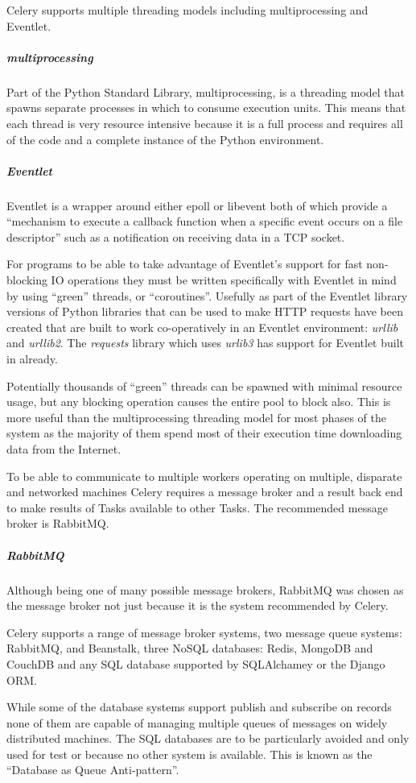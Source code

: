 Celery supports multiple threading models including multiprocessing and Eventlet.
\subparagraph{multiprocessing}
Part of the Python Standard Library, multiprocessing, is a threading model that spawns separate processes in which to consume execution units.  This means that each thread is very resource intensive because it is a full process and requires all of the code and a complete instance of the Python environment.

\subparagraph{Eventlet}
Eventlet is a wrapper around either epoll or libevent both of which provide a ``mechanism to execute a callback function when a specific event occurs on a file descriptor'' such as a notification on receiving data in a TCP socket. 

For programs to be able to take advantage of Eventlet's support for fast non-blocking IO operations they must be written specifically with Eventlet in mind by using ``green'' threads, or ``coroutines''.  Usefully as part of the Eventlet library versions of Python libraries that can be used to make HTTP requests have been created that are built to work co-operatively in an Eventlet environment: \emph{urllib} and \emph{urllib2}. The \emph{requests} library which uses \emph{urlib3} has support for Eventlet built in already.

Potentially thousands of ``green'' threads can be spawned with minimal resource usage, but any blocking operation causes the entire pool to block also. This is more useful than the multiprocessing threading model for most phases of the system as the majority of them spend most of their execution time downloading data from the Internet.

To be able to communicate to multiple workers operating on multiple, disparate and networked machines Celery requires a message broker and a result back end to make results of Tasks available to other Tasks.  The recommended message broker is RabbitMQ.

\subparagraph{RabbitMQ}
Although being one of many possible message brokers, RabbitMQ was chosen as the message broker not just because it is the system recommended by Celery.

Celery supports a range of message broker systems, two message queue systems: RabbitMQ, and Beanstalk, three NoSQL databases: Redis, MongoDB and CouchDB and any SQL database supported by SQLAlchamey or the Django ORM.

While some of the database systems support publish and subscribe on records none of them are capable of managing multiple queues of messages on widely distributed machines.  The SQL databases are to be particularly avoided and only used for test or because no other system is available. This is known as the ``Database as Queue Anti-pattern''\cite{database-as-mq}.

